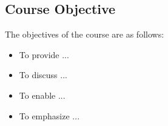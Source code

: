 \subsection{Course Objective}
The objectives of the course are as follows:
\begin{itemize}
\item To provide ...
\item To discuss ...
\item To enable ...
\item To emphasize ...
\end{itemize}
